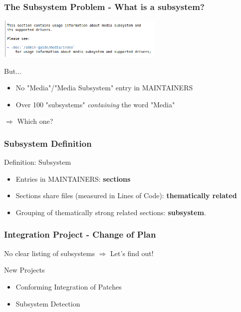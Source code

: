 \documentclass[9pt]{beamer}
\begin{document}
	\begin{frame}
	\frametitle{The Subsystem Problem - What is a subsystem?}
	\begin{center}
     	\includegraphics[width=0.6\textwidth]{pics/Media_subsystem.png}
	\end{center}

	\begin{block}{But... }
		\begin{itemize} %
		\item No "Media"/"Media Subsystem" entry in MAINTAINERS
		\item Over 100 "subsystems" \textit{containing} the word "Media"
		\end{itemize}
	\end{block}
	\begin{center}
	$\Rightarrow$ Which one?
	\end{center}
	\end{frame}

	\begin{frame} 
	\frametitle{Subsystem Definition}
		\begin{block}{Definition: Subsystem}
			\begin{itemize}
				\item Entries in MAINTAINERS: \textbf{sections}
				\item Sections share files (measured in Lines of Code): \textbf{thematically related}
				\item Grouping of thematically strong related sections: \textbf{subsystem}.
			\end{itemize}

		\end{block}
	\end{frame}

	\begin{frame}
	\frametitle{Integration Project - Change of Plan}
		\begin{block}{No clear listing of subsystems}
			$\Rightarrow$ Let's find out!
		\end{block}



		\begin{block}{New Projects}
			\begin{itemize}
				\item Conforming Integration of Patches
				\item Subsystem Detection
			\end{itemize}
		\end{block}
	\end{frame}
\end{document}
